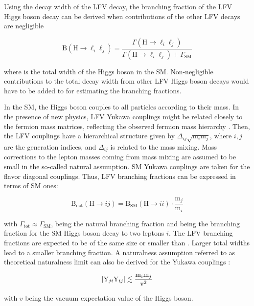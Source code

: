 Using the decay width of the LFV decay, the branching fraction of the LFV Higgs boson decay can be derived when contributions of the other LFV decays are negligible

\begin{equation}
  \mathrm{B}(\mathrm{H} \to \ell_{i} \ell_{j})=\frac{\Gamma(\mathrm{H} \to \ell_{i} \ell_{j})}{\Gamma(\mathrm{H} \to \ell_{i} \ell_{j})+\Gamma_{\mathrm{SM}}}
\end{equation}

where \gsm is the total width of the Higgs boson in the SM. Non-negligible contributions to the total decay width from other LFV Higgs boson decays would have to be added to \gsm for estimating the branching fractions.

In the SM, the Higgs boson couples to all particles according to their mass. In the presence of new physics, LFV Yukawa couplings might be related closely to the fermion mass matrices, reflecting the observed fermion mass hierarchy \cite{Cheng:1987rs}. Then, the LFV couplings have a hierarchical structure given by $\Delta_{i j} \sqrt{\mathrm{m}_{i} \mathrm{m}_{j}}$, where $i, j$ are the generation indices, and $\Delta_{i j}$ is related to the mass mixing. Mass corrections to the lepton masses coming from mass mixing are assumed to be small in the so-called natural assumption. SM Yukawa couplings are taken for the flavor diagonal couplings. Thus, LFV branching fractions can be expressed in terms of SM ones:

\begin{equation}
  \mathrm{B}_{\text {nat}}(\mathrm{H} \to i j)=\mathrm{B}_{\mathrm{SM}}(\mathrm{H} \to i i) \cdot \frac{\mathrm{m}_{j}}{\mathrm{m}_{i}}
\end{equation}

with $\Gamma_{\mathrm{tot}} \approx \Gamma_{\mathrm{SM}}$, \BHij being the natural branching fraction and \BHsm being the branching fraction for the SM Higgs boson decay to two leptons $i$. The LFV branching fractions are expected to be of the same size or smaller than \BHij. Larger total widths lead to a smaller branching fraction. A naturalness assumption referred to as theoretical naturalness limit can also be derived for the Yukawa couplings \Yij:

\begin{equation}
  |\text{Y}_{ji} \text{Y}_{ij}| \lesssim \frac{\mathrm{m}_{i} \mathrm{m}_{j}}{\mathrm{v}^2}
\end{equation}

with $v$ being the vacuum expectation value of the Higgs boson.

